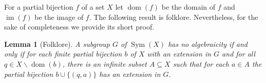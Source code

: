 \documentclass[11pt]{amsart}
\makeatletter
\newtheorem{lemma}[theorem]{Lemma}
\theoremstyle{definition}
\newcommand{\N}{\mathbb N}
\newcommand{\im}{\operatorname{im}}
\newcommand{\dom}{\operatorname{dom}}
\newcommand{\Sym}{\operatorname{Sym}}
\newcommand{\makeset}[2]{\left\lbrace #1 \;\middle|\;
 \begin{tabular}{@{}l@{}}
   #2
  \end{tabular}
  \right\rbrace}
\makeatother
\begin{document}

For a partial bijection $f$ of a set $X$ let $\dom(f)$ be the domain of $f$ and $\im(f)$ be the image of $f$. 
The following result is folklore. Nevertheless, for the sake of completeness we provide its short proof.

\begin{lemma}[Folklore]
A subgroup $G$ of $\Sym(X)$ has no algebraicity if and only if for each finite partial bijection \(b\) of \(X\) with an extension in \(G\) and for all \(q\in X\backslash\dom(b)\), there is an infinite subset \(A\subseteq X\) such that for each $a\in A$ the partial bijection \(b\cup \{(q, a)\}\) has an extension in \(G\).  
\end{lemma}
\end{document}

